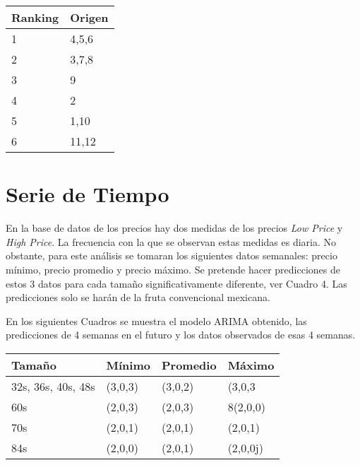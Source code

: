 \documentclass{article}
\begin{document}
\begin{center}
	\begin{tabular}{|l|l|}
	\hline
		Ranking & Origen\\ \hline
		1 & 4,5,6\\ \hline
		2 & 3,7,8\\ \hline
		3 & 9\\ \hline
		4 & 2 \\ \hline
		5 & 1,10 \\ \hline
		6 & 11,12\\ \hline
	\end{tabular}
\end{center}	

\section{Serie de Tiempo}
En la base de datos de los precios hay dos medidas de los precios \textit{Low Price} y \textit{High Price}. La frecuencia con la que se observan estas medidas es diaria. No obstante, para este análisis se tomaran los siguientes datos semanales: precio mínimo, precio promedio y  precio máximo. Se pretende hacer predicciones de estos 3 datos para cada tamaño significativamente diferente, ver Cuadro 4. Las predicciones solo se harán de la fruta convencional mexicana.

En los siguientes Cuadros se muestra el modelo ARIMA obtenido, las predicciones de 4 semanas en el futuro y los datos observados de esas 4 semanas.
\begin{center}
	\begin{tabular}{|l|l|l|l|}
	\hline
		Tamaño & Mínimo & Promedio& Máximo \\ \hline
		32s, 36s, 40s, 48s & (3,0,3)&(3,0,2) &(3,0,3\\ \hline
		60s & (2,0,3)& (2,0,3)&8(2,0,0)\\ \hline
		70s &(2,0,1) &(2,0,1) &(2,0,1) \\ \hline
		84s & (2,0,0) &(2,0,1) &(2,0,0j)\\ \hline
	\end{tabular}
\end{center}	
\end{document}
